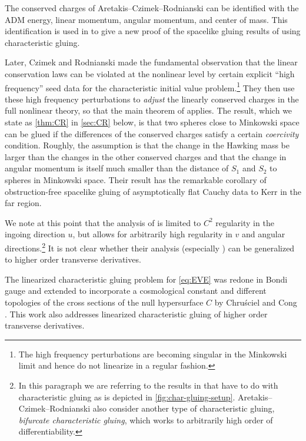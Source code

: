 \documentclass[10pt]{article}
\numberwithin{equation}{section}
\theoremstyle{plain}
\theoremstyle{definition}
\begin{document}
The conserved charges of Aretakis--Czimek--Rodnianski can be identified with the ADM energy, linear momentum, angular momentum, and center of mass. This identification is used in \cite{ACR3} to give a new proof of the spacelike gluing results of \cite{Corvino, CorvinoSchoen, Carlotto} using characteristic gluing. 

Later, Czimek and Rodnianski \cite{Czimek2022-cl} made the fundamental observation that the linear conservation laws can be violated at the nonlinear level by certain explicit ``high frequency'' seed data for the characteristic initial value problem.\footnote{The high frequency perturbations are becoming singular in the Minkowski limit and hence do not linearize in a regular fashion.} They then use these high frequency perturbations to \emph{adjust} the linearly conserved charges in the full nonlinear theory, so that the main theorem of \cite{ACR1} applies. The result, which we state as \cref{thm:CR} in \cref{sec:CR} below, is that two spheres close to Minkowski space can be glued if the differences of the conserved charges satisfy a certain \emph{coercivity} condition. Roughly, the assumption is that the change in the Hawking mass be larger than the changes in the other conserved charges and that the change in angular momentum is itself much smaller than the distance of $S_1$ and $S_2$ to spheres in Minkowski space. Their result has the remarkable corollary of obstruction-free spacelike gluing of asymptotically flat Cauchy data to Kerr in the far region.

We note at this point that the analysis of \cite{ACR1,ACR2,ACR3,Czimek2022-cl} is limited to $C^2$ regularity in the ingoing direction $u$, but allows for arbitrarily high regularity in $v$ and angular directions.\footnote{In this paragraph we are referring to the results in \cite{ACR1,ACR2,ACR3,Czimek2022-cl} that have to do with characteristic gluing as is depicted in \cref{fig:char-gluing-setup}. Aretakis--Czimek--Rodnianski also consider another type of characteristic gluing, \emph{bifurcate characteristic gluing}, which works to arbitrarily high order of differentiability.} It is not clear whether their analysis (especially \cite{Czimek2022-cl}) can be generalized to higher order transverse derivatives. 

The linearized characteristic gluing problem for \eqref{eq:EVE} was redone in Bondi gauge and extended to incorporate a cosmological constant and different topologies of the cross sections of the null hypersurface $C$ by Chru\'sciel and Cong \cite{Chrusciel-Cong}. This work also addresses linearized characteristic gluing of higher order transverse derivatives. 
\end{document}
